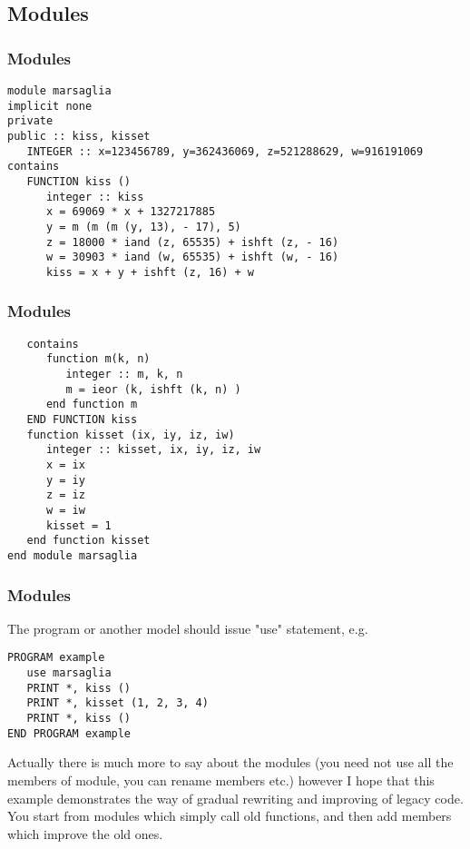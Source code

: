 \documentclass{beamer}
\begin{document}
\subsection{Modules}
\begin{frame}[fragile]
\frametitle{Modules}
\begin{verbatim}
module marsaglia
implicit none
private
public :: kiss, kisset
   INTEGER :: x=123456789, y=362436069, z=521288629, w=916191069
contains
   FUNCTION kiss ()
      integer :: kiss
      x = 69069 * x + 1327217885
      y = m (m (m (y, 13), - 17), 5)
      z = 18000 * iand (z, 65535) + ishft (z, - 16)
      w = 30903 * iand (w, 65535) + ishft (w, - 16)
      kiss = x + y + ishft (z, 16) + w
\end{verbatim}
\end{frame}
\begin{frame}[fragile]
\frametitle{Modules}
\begin{verbatim}
   contains
      function m(k, n)
         integer :: m, k, n
         m = ieor (k, ishft (k, n) )
      end function m
   END FUNCTION kiss
   function kisset (ix, iy, iz, iw)
      integer :: kisset, ix, iy, iz, iw
      x = ix
      y = iy
      z = iz
      w = iw
      kisset = 1
   end function kisset
end module marsaglia
\end{verbatim}
\end{frame}
\begin{frame}[fragile]
\frametitle{Modules}
The program or another model should issue "use" statement, e.g. 
\begin{verbatim}
PROGRAM example
   use marsaglia
   PRINT *, kiss ()
   PRINT *, kisset (1, 2, 3, 4)
   PRINT *, kiss ()
END PROGRAM example
\end{verbatim}
Actually there is much more to say about the modules (you need not use all the members of module,
you can rename members etc.) however I hope that this example demonstrates the way of gradual rewriting
and improving of legacy code. You start from modules which simply call old functions, and then add members
which improve the old ones.
\end{frame}
\end{document}
